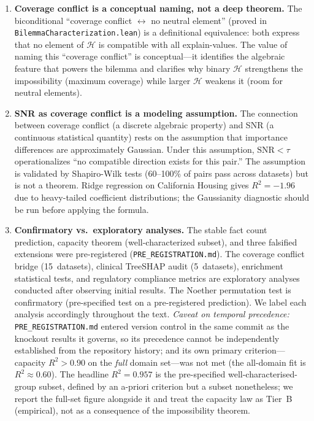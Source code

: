 \documentclass[11pt,a4paper]{article}
\begin{document}
\begin{enumerate}[label=(\arabic*)]
The drug discovery experiment (Section~\ref{sec:drug-discovery}) demonstrates this bottleneck concretely: Pearson-based clustering predicts 0\% instability on binary fingerprints while MI-based clustering recovers the observed 23\% rate within 16\%. However, the Noether bimodal structure transfers only for domains with discrete group structure, not for diffuse overlap patterns.
  \item \textbf{Coverage conflict is a conceptual naming, not a deep theorem.}  The biconditional ``coverage conflict $\leftrightarrow$ no neutral element'' (proved in \texttt{BilemmaCharacterization.lean}) is a definitional equivalence: both express that no element of $\mathcal{H}$ is compatible with all explain-values.  The value of naming this ``coverage conflict'' is conceptual---it identifies the algebraic feature that powers the bilemma and clarifies why binary $\mathcal{H}$ strengthens the impossibility (maximum coverage) while larger $\mathcal{H}$ weakens it (room for neutral elements).
  \item \textbf{SNR as coverage conflict is a modeling assumption.}  The connection between coverage conflict (a discrete algebraic property) and SNR (a continuous statistical quantity) rests on the assumption that importance differences are approximately Gaussian.  Under this assumption, $\text{SNR} < \tau$ operationalizes ``no compatible direction exists for this pair.''  The assumption is validated by Shapiro-Wilk tests (60--100\% of pairs pass across datasets) but is not a theorem.  Ridge regression on California Housing gives $R^2 = -1.96$ due to heavy-tailed coefficient distributions; the Gaussianity diagnostic should be run before applying the formula.
  \item \textbf{Confirmatory vs.\ exploratory analyses.}  The stable fact count prediction, capacity theorem (well-characterized subset), and three falsified extensions were pre-registered (\texttt{PRE\_REGISTRATION.md}).  The coverage conflict bridge (15~datasets), clinical TreeSHAP audit (5~datasets), enrichment statistical tests, and regulatory compliance metrics are exploratory analyses conducted after observing initial results.  The Noether permutation test is confirmatory (pre-specified test on a pre-registered prediction).  We label each analysis accordingly throughout the text.  \emph{Caveat on temporal precedence:} \texttt{PRE\_REGISTRATION.md} entered version control in the same commit as the knockout results it governs, so its precedence cannot be independently established from the repository history; and its own primary criterion---capacity $R^2>0.90$ on the \emph{full} domain set---was not met (the all-domain fit is $R^2\approx0.60$).  The headline $R^2=0.957$ is the pre-specified well-characterised-group subset, defined by an a-priori criterion but a subset nonetheless; we report the full-set figure alongside it and treat the capacity law as Tier~B (empirical), not as a consequence of the impossibility theorem.

\end{enumerate}
\end{document}
